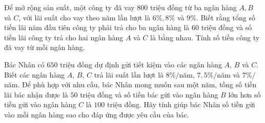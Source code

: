 \begin{bt}%
	Để mở rộng sản suất, một công ty đã vay $800$ triệu đồng từ ba ngân hàng $A, B$ và $C$, với lãi suất cho vay theo năm lần lượt là $6 \%, 8 \%$ và $9 \%$. Biết rằng tổng số tiền lãi năm đầu tiên công ty phải trả cho ba ngân hàng là $60$ triệu đồng và số tiền lãi công ty trả cho hai ngân hàng $A$ và $C$ là bằng nhau. Tính số tiền công ty đã vay từ mỗi ngân hàng.
	\end{bt}
\begin{bt}%
	Bác Nhân có $650$ triệu đồng dự định gửi tiết kiệm vào các ngân hàng $A$, $B$ và $C$. Biết các ngân hàng $A$, $B$, $C$ trả lãi suất lần lượt là $8 \% /$năm, $7{,}5 \% /$năm và $7 \% /$năm. Để phù hợp với nhu cầu, bác Nhân mong muốn sau một năm, tồng số tiền lãi bác nhận được là $50$ triệu đồng và số tiền bác gửi vào ngân hàng $B$ lớn hơn số tiền gửi vào ngân hàng $C$ là $100$ triệu đồng. Hãy tính giúp bác Nhân số tiền gửi vào mỗi ngân hàng sao cho đáp ứng được yêu cầu của bác.
		\end{bt}
